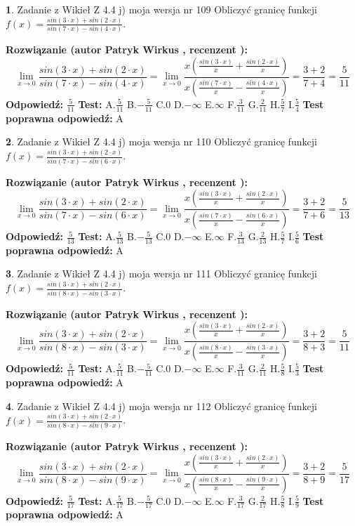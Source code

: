 \documentclass[12pt, a4paper]{article}
\theoremstyle{definition} %
\newtheorem{zad}{}
\newcommand{\zadStart}[1]{\begin{zad}#1\newline}
\newcommand{\zadStop}{\end{zad}}
\newcommand{\rozwStart}[2]{\noindent \textbf{Rozwiązanie (autor #1 , recenzent #2): }\newline}
\newcommand{\rozwStop}{\newline}
\newcommand{\odpStart}{\noindent \textbf{Odpowiedź:}\newline}
\newcommand{\odpStop}{\newline}
\newcommand{\testStart}{\noindent \textbf{Test:}\newline}
\newcommand{\testStop}{\newline}
\newcommand{\kluczStart}{\noindent \textbf{Test poprawna odpowiedź:}\newline}
\newcommand{\kluczStop}{\newline}
\begin{document}
\zadStart{Zadanie z Wikieł Z 4.4 j) moja wersja nr 109}
Obliczyć granicę funkcji $f(x)=\frac{sin(3\cdot x) +sin(2\cdot x)}{sin(7\cdot x) -sin(4\cdot x)}$.
\zadStop
\rozwStart{Patryk Wirkus}{}
$$\lim\limits_{x\to 0}\frac{sin(3\cdot x) +sin(2\cdot x)}{sin(7\cdot x) -sin(4\cdot x)}=\lim\limits_{x\to 0}\frac{x(\frac{sin(3\cdot x)}{x}+\frac{sin(2\cdot x)}{x})}{x(\frac{sin(7\cdot x)}{x}-\frac{sin(4\cdot x)}{x})}=\frac{3+2}{7+4} = \frac{5}{11}$$
\rozwStop
\odpStart
$\frac{5}{11}$
\odpStop
\testStart
A.$\frac{5}{11}$
B.$-\frac{5}{11}$
C.$0$
D.$-\infty$
E.$\infty$
F.$\frac{3}{11}$
G.$\frac{2}{11}$
H.$\frac{5}{7}$
I.$\frac{5}{4}$
\testStop
\kluczStart
A
\kluczStop



\zadStart{Zadanie z Wikieł Z 4.4 j) moja wersja nr 110}
Obliczyć granicę funkcji $f(x)=\frac{sin(3\cdot x) +sin(2\cdot x)}{sin(7\cdot x) -sin(6\cdot x)}$.
\zadStop
\rozwStart{Patryk Wirkus}{}
$$\lim\limits_{x\to 0}\frac{sin(3\cdot x) +sin(2\cdot x)}{sin(7\cdot x) -sin(6\cdot x)}=\lim\limits_{x\to 0}\frac{x(\frac{sin(3\cdot x)}{x}+\frac{sin(2\cdot x)}{x})}{x(\frac{sin(7\cdot x)}{x}-\frac{sin(6\cdot x)}{x})}=\frac{3+2}{7+6} = \frac{5}{13}$$
\rozwStop
\odpStart
$\frac{5}{13}$
\odpStop
\testStart
A.$\frac{5}{13}$
B.$-\frac{5}{13}$
C.$0$
D.$-\infty$
E.$\infty$
F.$\frac{3}{13}$
G.$\frac{2}{13}$
H.$\frac{5}{7}$
I.$\frac{5}{6}$
\testStop
\kluczStart
A
\kluczStop



\zadStart{Zadanie z Wikieł Z 4.4 j) moja wersja nr 111}
Obliczyć granicę funkcji $f(x)=\frac{sin(3\cdot x) +sin(2\cdot x)}{sin(8\cdot x) -sin(3\cdot x)}$.
\zadStop
\rozwStart{Patryk Wirkus}{}
$$\lim\limits_{x\to 0}\frac{sin(3\cdot x) +sin(2\cdot x)}{sin(8\cdot x) -sin(3\cdot x)}=\lim\limits_{x\to 0}\frac{x(\frac{sin(3\cdot x)}{x}+\frac{sin(2\cdot x)}{x})}{x(\frac{sin(8\cdot x)}{x}-\frac{sin(3\cdot x)}{x})}=\frac{3+2}{8+3} = \frac{5}{11}$$
\rozwStop
\odpStart
$\frac{5}{11}$
\odpStop
\testStart
A.$\frac{5}{11}$
B.$-\frac{5}{11}$
C.$0$
D.$-\infty$
E.$\infty$
F.$\frac{3}{11}$
G.$\frac{2}{11}$
H.$\frac{5}{8}$
I.$\frac{5}{3}$
\testStop
\kluczStart
A
\kluczStop



\zadStart{Zadanie z Wikieł Z 4.4 j) moja wersja nr 112}
Obliczyć granicę funkcji $f(x)=\frac{sin(3\cdot x) +sin(2\cdot x)}{sin(8\cdot x) -sin(9\cdot x)}$.
\zadStop
\rozwStart{Patryk Wirkus}{}
$$\lim\limits_{x\to 0}\frac{sin(3\cdot x) +sin(2\cdot x)}{sin(8\cdot x) -sin(9\cdot x)}=\lim\limits_{x\to 0}\frac{x(\frac{sin(3\cdot x)}{x}+\frac{sin(2\cdot x)}{x})}{x(\frac{sin(8\cdot x)}{x}-\frac{sin(9\cdot x)}{x})}=\frac{3+2}{8+9} = \frac{5}{17}$$
\rozwStop
\odpStart
$\frac{5}{17}$
\odpStop
\testStart
A.$\frac{5}{17}$
B.$-\frac{5}{17}$
C.$0$
D.$-\infty$
E.$\infty$
F.$\frac{3}{17}$
G.$\frac{2}{17}$
H.$\frac{5}{8}$
I.$\frac{5}{9}$
\testStop
\kluczStart
A
\kluczStop
\end{document}

